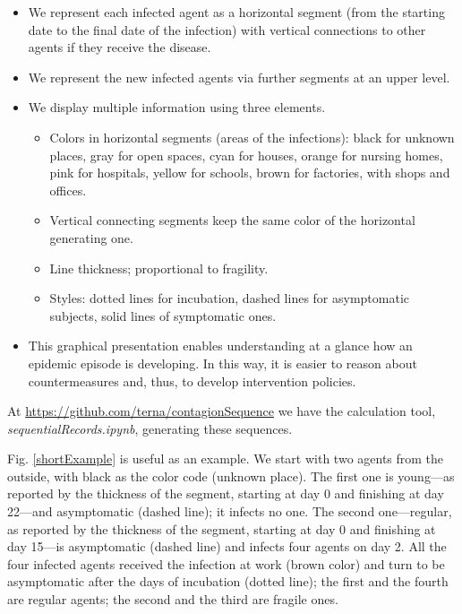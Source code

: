 \documentclass[graybox]{svmult}
\begin{document}
 \begin{itemize}
 \item
We represent each infected agent as a horizontal segment (from the starting date to the final date of the infection) with vertical connections to other agents if they receive the disease.

 \item
We represent the new infected agents via further segments at an upper level. 

 \item
We display multiple information using three elements.
 \begin{itemize}
 \item Colors in horizontal segments (areas of the infections): black for unknown places, gray for open spaces, cyan for houses, orange for nursing homes, pink for hospitals, yellow for schools, brown for factories, with shops and offices.
 \item Vertical connecting segments keep the same color of the horizontal generating one. 
 \item Line thickness; proportional to fragility.
 \item Styles: dotted lines for incubation, dashed lines for asymptomatic subjects, solid lines of symptomatic ones.
 \end{itemize}
 \item
This graphical presentation enables understanding at a glance how an epidemic episode is developing. In this way, it is easier to reason about countermeasures and, thus, to develop intervention policies. 
 \end{itemize}

At \href{https://github.com/terna/contagionSequence}{https://github.com/terna/contagionSequence} we have the calculation tool, \emph{sequentialRecords.ipynb}, generating these sequences.
 

Fig. \ref{shortExample} is useful as an example. 
We start with two agents from the outside, with black as the color code (unknown place). The first one is young---as reported by the thickness of the segment, starting at day 0 and finishing at day 22---and asymptomatic (dashed line); it infects no one. The second one---regular, as reported by the thickness of the segment, starting at day 0 and finishing at day 15---is asymptomatic (dashed line) and infects four agents on day 2. All the four infected agents received the infection at work (brown color) and turn to be asymptomatic after the days of incubation (dotted line); the first and the fourth are regular agents; the second and the third are fragile ones.
\end{document}
